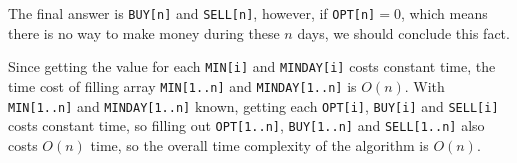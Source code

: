 \documentclass[12pt,letterpaper]{article}
\begin{document}
The final answer is \texttt{BUY[n]} and \texttt{SELL[n]}, however, if \texttt{OPT[n]}$ = 0$, which means there is no way to make money during these $n$ days, we should conclude this fact.

Since getting the value for each \texttt{MIN[i]} and \texttt{MINDAY[i]} costs constant time, the time cost of filling array \texttt{MIN[1..n]} and \texttt{MINDAY[1..n]} is $O(n)$. With \texttt{MIN[1..n]} and \texttt{MINDAY[1..n]} known, getting each \texttt{OPT[i]}, \texttt{BUY[i]} and \texttt{SELL[i]} costs constant time, so filling out \texttt{OPT[1..n]}, \texttt{BUY[1..n]} and \texttt{SELL[1..n]} also costs $O(n)$ time, so the overall time complexity of the algorithm is $O(n)$.
\end{document}
